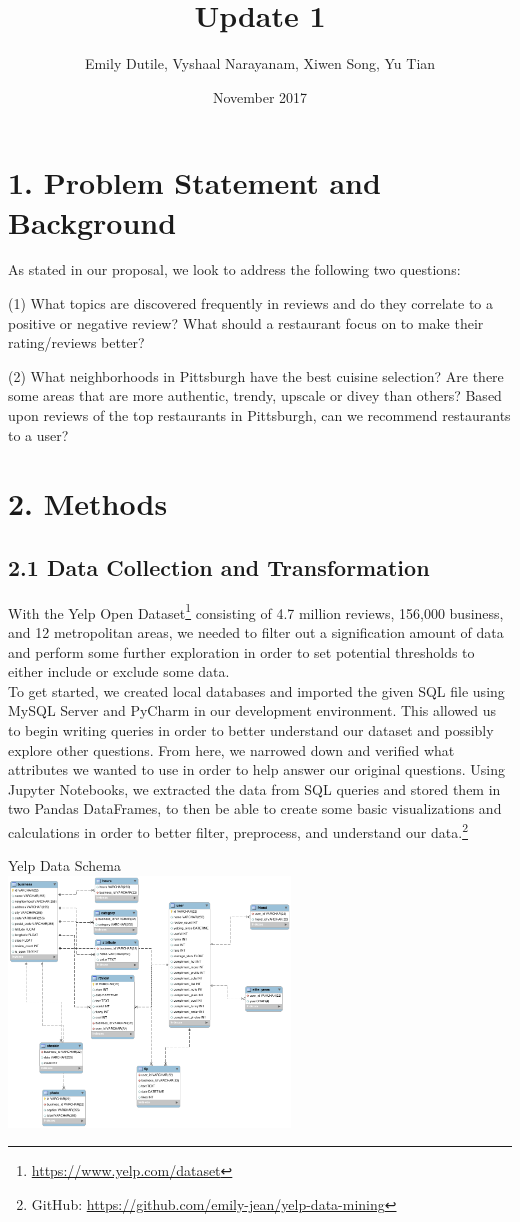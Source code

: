 \documentclass{neu_handout}
\title{Update 1}
\author{Emily Dutile, Vyshaal Narayanam, Xiwen Song, Yu Tian}
\date{November 2017}
\begin{document}
\section*{1. Problem Statement and Background}
As stated in our proposal, we look to address the following two questions:

(1) What topics are discovered frequently in reviews and do they correlate to a positive or negative review? What should a restaurant focus on to make their rating/reviews better?

(2) What neighborhoods in Pittsburgh have the best cuisine selection? Are there some areas that are more authentic, trendy, upscale or divey than others? Based upon reviews of the top restaurants in Pittsburgh, can we recommend restaurants to a user?

\section*{2. Methods}

\subsection*{2.1 Data Collection and Transformation}
With the Yelp Open Dataset\footnote{\url{https://www.yelp.com/dataset}} consisting of 4.7 million reviews, 156,000 business, and 12 metropolitan areas, we needed to filter out a signification amount of data and perform some further exploration in order to set potential thresholds to either include or exclude some data.\\
To get started, we created local databases and imported the given SQL file using MySQL Server and PyCharm in our development environment. This allowed us to begin writing queries in order to better understand our dataset and possibly explore other questions. From here, we narrowed down and verified what attributes we wanted to use in order to help answer our original questions.  Using Jupyter Notebooks, we extracted the data from SQL queries and stored them in two Pandas DataFrames, to then be able to create some basic visualizations and calculations in order to better filter, preprocess, and understand our data.\footnote{GitHub: \url{https://github.com/emily-jean/yelp-data-mining}}\\

\begin{center}
Yelp Data Schema\\
\includegraphics[width=75mm,scale=0.4]{schema}\\
\end{center}
\end{document}
